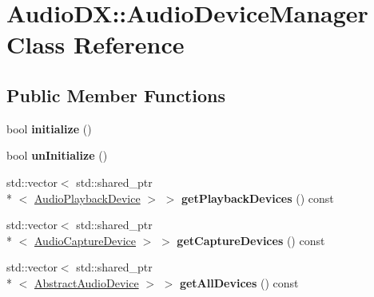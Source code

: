 \hypertarget{class_audio_d_x_1_1_audio_device_manager}{\section{Audio\-D\-X\-:\-:Audio\-Device\-Manager Class Reference}
\label{class_audio_d_x_1_1_audio_device_manager}
}
\subsection*{Public Member Functions}
\begin{DoxyCompactItemize}
\item 
\hypertarget{class_audio_d_x_1_1_audio_device_manager_abf9da36f8c05a6e21eb46a71e5370342}{bool {\bfseries initialize} ()}\label{class_audio_d_x_1_1_audio_device_manager_abf9da36f8c05a6e21eb46a71e5370342}

\item 
\hypertarget{class_audio_d_x_1_1_audio_device_manager_a16f6e3bad725b0cbcc412ad1d71c74fd}{bool {\bfseries un\-Initialize} ()}\label{class_audio_d_x_1_1_audio_device_manager_a16f6e3bad725b0cbcc412ad1d71c74fd}

\item 
\hypertarget{class_audio_d_x_1_1_audio_device_manager_ac28b6ccb55dd9298c87d3646551853f8}{std\-::vector$<$ std\-::shared\-\_\-ptr\\*
$<$ \hyperlink{class_audio_d_x_1_1_audio_playback_device}{Audio\-Playback\-Device} $>$ $>$ {\bfseries get\-Playback\-Devices} () const }\label{class_audio_d_x_1_1_audio_device_manager_ac28b6ccb55dd9298c87d3646551853f8}

\item 
\hypertarget{class_audio_d_x_1_1_audio_device_manager_a16ea9809c9a042ceeb0c29d39959862e}{std\-::vector$<$ std\-::shared\-\_\-ptr\\*
$<$ \hyperlink{class_audio_d_x_1_1_audio_capture_device}{Audio\-Capture\-Device} $>$ $>$ {\bfseries get\-Capture\-Devices} () const }\label{class_audio_d_x_1_1_audio_device_manager_a16ea9809c9a042ceeb0c29d39959862e}

\item 
\hypertarget{class_audio_d_x_1_1_audio_device_manager_a1cb22811ab6b73c1c0b4461870ec6f27}{std\-::vector$<$ std\-::shared\-\_\-ptr\\*
$<$ \hyperlink{class_audio_d_x_1_1_abstract_audio_device}{Abstract\-Audio\-Device} $>$ $>$ {\bfseries get\-All\-Devices} () const }\label{class_audio_d_x_1_1_audio_device_manager_a1cb22811ab6b73c1c0b4461870ec6f27}


\end{DoxyCompactItemize}
